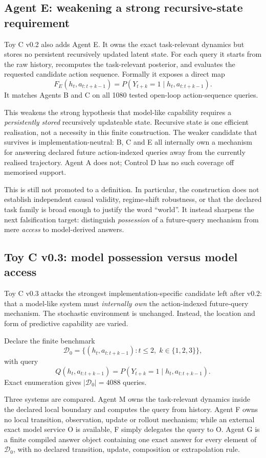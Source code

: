 \documentclass[10pt]{article}
\begin{document}
\subsection{Agent E: weakening a strong recursive-state requirement}

Toy C v0.2 also adds Agent E. It owns the exact task-relevant dynamics but stores no persistent recursively updated latent state. For each query it starts from the raw history, recomputes the task-relevant posterior, and evaluates the requested candidate action sequence. Formally it exposes a direct map
\[
F_E(h_t,a_{t:t+k-1})
=
P(Y_{t+k}=1\mid h_t,a_{t:t+k-1}).
\]
It matches Agents B and C on all 1080 tested open-loop action-sequence queries.

This weakens the strong hypothesis that model-like capability requires a \emph{persistently stored} recursively updateable state. Recursive state is one efficient realisation, not a necessity in this finite construction. The weaker candidate that survives is implementation-neutral: B, C and E all internally own a mechanism for answering declared future action-indexed queries away from the currently realised trajectory. Agent A does not; Control D has no such coverage off memorised support.

This is still not promoted to a definition. In particular, the construction does not establish independent causal validity, regime-shift robustness, or that the declared task family is broad enough to justify the word ``world''. It instead sharpens the next falsification target: distinguish \emph{possession} of a future-query mechanism from mere \emph{access} to model-derived answers.


\subsection{Toy C v0.3: model possession versus model access}

Toy C v0.3 attacks the strongest implementation-specific candidate left after v0.2: that a model-like system must \emph{internally own} the action-indexed future-query mechanism. The stochastic environment is unchanged. Instead, the location and form of predictive capability are varied.

Declare the finite benchmark
\[
\mathcal D_0
=
\{(h_t,a_{t:t+k-1}):t\le2,\;k\in\{1,2,3\}\},
\]
with query
\[
Q(h_t,a_{t:t+k-1})
=
P(Y_{t+k}=1\mid h_t,a_{t:t+k-1}).
\]
Exact enumeration gives $|\mathcal D_0|=4088$ queries.

Three systems are compared. Agent M owns the task-relevant dynamics inside the declared local boundary and computes the query from history. Agent F owns no local transition, observation, update or rollout mechanism; while an external exact model service O is available, F simply delegates the query to O. Agent G is a finite compiled answer object containing one exact answer for every element of $\mathcal D_0$, with no declared transition, update, composition or extrapolation rule.
\end{document}
